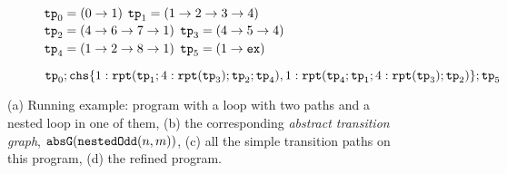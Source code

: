 {\begin{figure}
\begin{subfigure}{.52\textwidth}
\begin{centering}
\vspace{-0.5cm}
\caption{}
\end{centering}
\end{subfigure}
\begin{subfigure}{.9\textwidth}    
\begin{centering}
{\small
$\mathtt{tp}_0 = (0 \to 1)$
\quad
$\mathtt{tp}_1 = (1 \to 2 \to 3 \to 4)$
\quad
$\mathtt{tp}_2 = (4 \to 6 \to 7 \to 1)$
\quad
$\mathtt{tp}_3 = (4 \to 5 \to 4)$
\quad
$\mathtt{tp}_4 = (1 \to 2 \to 8 \to 1)$
\quad
$\mathtt{tp}_5 = (1 \to \mathtt{ex})$
}
\vspace{-0.3cm}
\caption{}
\end{centering}
\end{subfigure}
\begin{subfigure}{.8\textwidth}    
  \begin{centering}
  $
  \tpath_0 ; \rpchoose{ 1: \rprepeat(\tpath_1; 4:\rprepeat(\tpath_3); \tpath_2; \tpath_4), 
  1: \rprepeat(\tpath_4; \tpath_1; 4:\rprepeat(\tpath_3); \tpath_2) }; \tpath_5
  $
  \caption{}
  \end{centering}
  \end{subfigure}
\caption{
(a) Running example: program with a loop with two  paths and a nested loop in one of them,
(b) the corresponding \emph{abstract transition graph}, $\mathtt{abs}{\mathtt{G}}(\mathtt{nestedOdd}(n, m))$,
(c) all the simple transition paths on this program,
(d) the refined program.}
\label{fig:relatedNestedWhileOdd-overview}
\end{figure}
}
%
